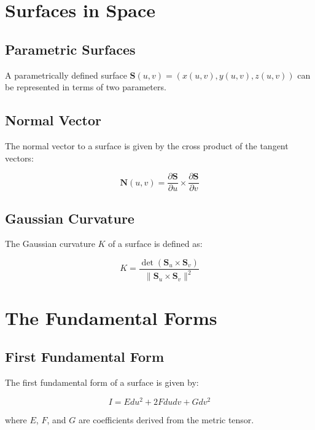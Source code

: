 \documentclass{article}
\begin{document}
\section{Surfaces in Space}

\subsection{Parametric Surfaces}

A parametrically defined surface $\mathbf{S}(u, v) = (x(u, v), y(u, v), z(u, v))$ can be represented in terms of two parameters.

\subsection{Normal Vector}

The normal vector to a surface is given by the cross product of the tangent vectors:

\begin{equation}
    \mathbf{N}(u, v) = \frac{\partial \mathbf{S}}{\partial u} \times \frac{\partial \mathbf{S}}{\partial v}
\end{equation}

\subsection{Gaussian Curvature}

The Gaussian curvature $K$ of a surface is defined as:

\begin{equation}
    K = \frac{\det(\mathbf{S}_u \times \mathbf{S}_v)}{\|\mathbf{S}_u \times \mathbf{S}_v\|^2}
\end{equation}

\section{The Fundamental Forms}

\subsection{First Fundamental Form}

The first fundamental form of a surface is given by:

\begin{equation}
    I = E du^2 + 2F du dv + G dv^2
\end{equation}

where $E$, $F$, and $G$ are coefficients derived from the metric tensor.
\end{document}
